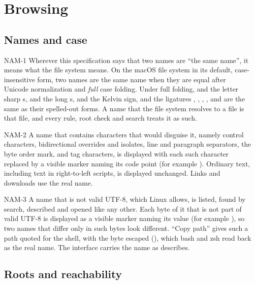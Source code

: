 \section{Browsing}
\label{sec:browsing}

\subsection{Names and case}
\label{sec:names}

\begin{req}{NAM-1}
Wherever this specification says that two names are ``the same name'', it means
what the file system means.  On the macOS file system in its default,
case-insensitive form, two names are the same name when they are equal after
Unicode normalization and \emph{full} case folding.  Under full folding,
 and the letter sharp s,  and the long s,  and the Kelvin
sign, and the ligatures , , , , 
and  are the same as their spelled-out forms.  A name that the file system
resolves to a file is that file, and every rule, root check and search treats it as
such.
\end{req}

\begin{req}{NAM-2}
A name that contains characters that would disguise it, namely control characters,
bidirectional overrides and isolates, line and paragraph separators, the byte order
mark, and tag characters, is displayed with each such character replaced by a
visible marker naming its code point (for example ).
Ordinary text, including text in right-to-left scripts, is displayed unchanged.
Links and downloads use the real name.
\end{req}

\begin{req}{NAM-3}
A name that is not valid UTF-8, which Linux allows, is listed, found by search,
described and opened like any other.  Each byte of it that is not part of valid
UTF-8 is displayed as a visible marker naming its value (for example
), so two names that differ only in such
bytes look different.  ``Copy path'' gives such a path quoted for the shell, with the
byte escaped (), which bash and zsh read back as
the real name.  The interface carries the name as  describes.
\end{req}

\subsection{Roots and reachability}

